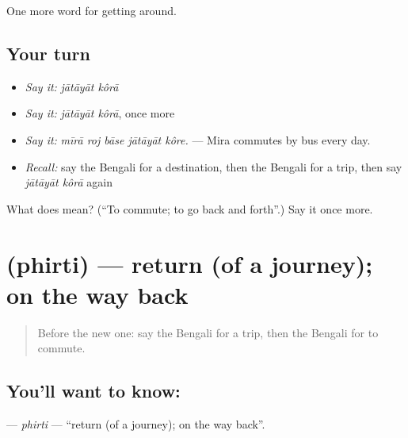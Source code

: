 \begin{grammarlens}[title={What you've built}]
One more word for getting around.
\end{grammarlens}

\subsection*{Your turn}
\begin{itemize}
\raggedright
  \item \emph{Say it:} \emph{jātāyāt kôrā}
  \item \emph{Say it:} \emph{jātāyāt kôrā}, once more
  \item \emph{Say it:} \emph{mīrā roj bāse jātāyāt kôre.} — Mira commutes by bus every day.
  \item \emph{Recall:} say the Bengali for a destination, then the Bengali for a trip, then say \emph{jātāyāt kôrā} again
\end{itemize}

\begin{tcolorbox}[breakable,colback=teal!4,colframe=teal!35!black,title={Before you move on}]
What does   mean? (\textquotedblleft{}To commute; to go back and forth\textquotedblright{}.) Say it once more.
\end{tcolorbox}
\section[\texorpdfstring{\bn{ফিরতি} (phirti)}{ফিরতি (phirti)}]{ (phirti) — return (of a journey); on the way back}

\label{lesson:BN-C387-phirti}



\begin{quote}
Before the new one: say the Bengali for a trip, then the Bengali for to commute.
\end{quote}

\subsection*{You'll want to know: }
\textbf{} — \emph{phirti} — \textquotedblleft{}return (of a journey); on the way back\textquotedblright{}.

\begin{quote}
     
\end{quote}

